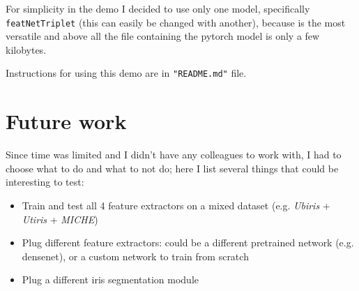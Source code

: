 \documentclass{article}
\begin{document}
For simplicity in the demo I decided to use only one model, specifically \texttt{featNetTriplet} (this can easily be changed with another), because is the most versatile and above all the file containing the pytorch model is only a few kilobytes. 

\bigskip
Instructions for using this demo are in \texttt{"README.md"} file.

\section{Future work}
Since time was limited and I didn't have any colleagues to work with, I had to choose what to do and what to not do; here I list several things that could be interesting to test:
\begin{itemize}
    \item Train and test all 4 feature extractors on a mixed dataset (e.g. \textit{Ubiris} + \textit{Utiris} + \textit{MICHE})
    \item Plug different feature extractors: could be a different pretrained network (e.g. densenet), or a custom network to train from scratch
    \item Plug a different iris segmentation module
\end{itemize}
\printbibliography
\end{document}

